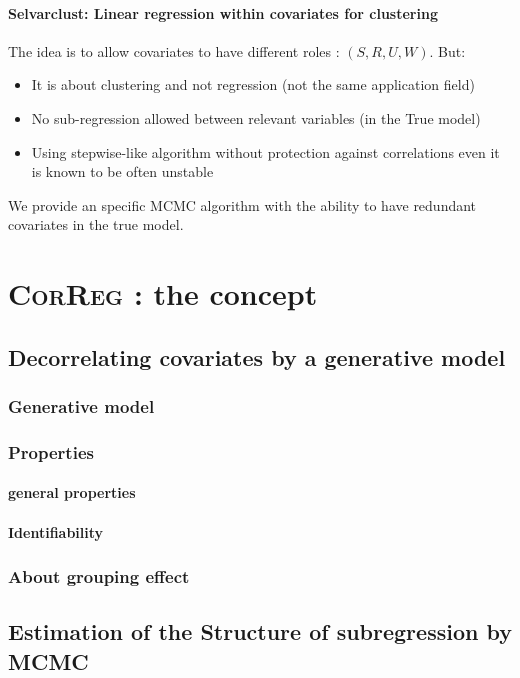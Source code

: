 \documentclass[11pt,a4paper]{report}
\begin{document}
		\subsection{Selvarclust: Linear regression within covariates for clustering}
			\cite{maugis2009variable}
			The idea is to allow covariates to have different roles : $(S,R,U,W)$.
			But:
			\begin{itemize}
				\item It is about clustering and not regression (not the same application field)
				\item No sub-regression allowed between relevant variables (in the True model)
				\item Using stepwise-like algorithm without protection against correlations \cite{raftery2006variable} even it is known to be often unstable \cite{miller2002subset}
			\end{itemize}	
			We provide an specific MCMC algorithm with the ability to have redundant covariates in the true model.		 
\part{\textsc{CorReg} : the concept}
\chapter{Decorrelating covariates by a generative model}
	\section{Generative model}
	\section{Properties}
		\subsection{general properties}
		\subsection{Identifiability}
	\section{About grouping effect}
\chapter{Estimation of the Structure of subregression by MCMC}
\end{document}
